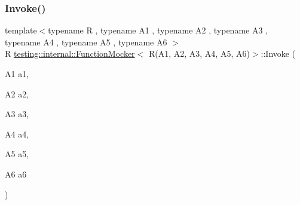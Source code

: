 \subsubsection{\texorpdfstring{Invoke()}{Invoke()}}
{\footnotesize\ttfamily template$<$typename R , typename A1 , typename A2 , typename A3 , typename A4 , typename A5 , typename A6 $>$ \\
R \mbox{\hyperlink{classtesting_1_1internal_1_1FunctionMocker}{testing\+::internal\+::\+Function\+Mocker}}$<$ R(A1, A2, A3, A4, A5, A6)$>$\+::Invoke (\begin{DoxyParamCaption}\item[{A1}]{a1,  }\item[{A2}]{a2,  }\item[{A3}]{a3,  }\item[{A4}]{a4,  }\item[{A5}]{a5,  }\item[{A6}]{a6 }\end{DoxyParamCaption})\hspace{0.3cm}{\ttfamily [inline]}}

\mbox{\label{classtesting_1_1internal_1_1FunctionMocker_3_01R_07A1_00_01A2_00_01A3_00_01A4_00_01A5_00_01A6_08_4_a5aaa2bc19a6180f55eee2cc1e0dfa939}} 

